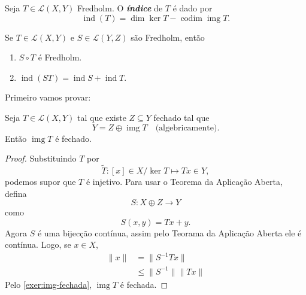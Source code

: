 \documentclass[portuguese]{article}
\theoremstyle{definition}
\DeclareMathOperator{\img}{img}
\begin{document}
\begin{defn}
	Seja $T\in\mathcal{L}(X,Y)$ Fredholm. O \textbf{\textit{índice}} de $T$ é dado por
	\[\operatorname{ind}(T)=\dim\ker T-\operatorname{codim}\img T.\]
\end{defn}
\begin{teo}\label{teo:fredholm-conditions}
	Se $T\in\mathcal{L}(X,Y)$ e $S\in\mathcal{L}(Y,Z)$ são Fredholm, então
	\begin{enumerate}
		\item $S\circ T$ é Fredholm.
		\item $\operatorname{ind}(ST)=\operatorname{ind}S 
		+\operatorname{ind}T$.
	\end{enumerate}
\end{teo}
Primeiro vamos provar:
\begin{prop}
	Seja $T\in\mathcal{L}(X,Y)$ tal que existe $Z\subseteq Y$ fechado tal que
	\[Y=Z\oplus\img T\quad\text{(algebricamente)}.\]
	Então $\img T$ é fechado.
\end{prop}
\begin{proof}
	Substituindo $T$ por 
	\[\tilde{T}:[x]\in X/\ker T\mapsto Tx\in Y,\]
	podemos supor que $T$ é injetivo. Para usar o Teorema da Aplicação Aberta, defina
	\[S:X\oplus Z\to Y\]
	como
	\[S(x,y)=Tx+y.\]
	Agora $S$ é uma bijecção contínua, assim pelo Teorama da Aplicação Aberta ele é contínua. Logo, se $x\in X$,
	\begin{align*}
		\|x\|&=\|S^{-1}Tx\|\\
		&\leq\|S^{-1}\|\|Tx\|
	\end{align*}
	Pelo \cref{exer:img-fechada}, $\img T$ é fechada.
\end{proof}
\end{document}
